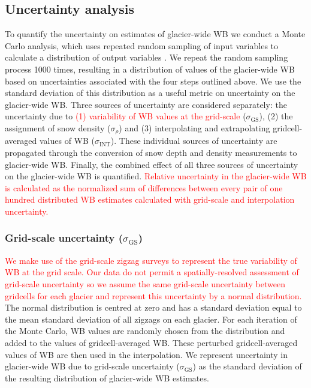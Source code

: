 \documentclass[twocolumn, letterpaper]{igs}
\begin{document}
\subsection{Uncertainty analysis}

To quantify the uncertainty on estimates of glacier-wide WB we conduct a Monte Carlo analysis, which uses repeated random sampling of input variables to calculate a distribution of output variables \citep{Metropolis1949}. We repeat the random sampling process 1000 times, resulting in a distribution of values of the glacier-wide WB based on uncertainties associated with the four steps outlined above. We use the standard deviation of this distribution as a useful metric on uncertainty on the glacier-wide WB. Three sources of uncertainty are considered separately: the uncertainty due to \textcolor{red}{(1) variability of WB values at the grid-scale} ($\sigma_{\mathrm{GS}}$), (2) the assignment of snow density ($\sigma_{\rho}$) and (3) interpolating and extrapolating gridcell-averaged values of WB ($\sigma_{\mathrm{INT}}$). These individual sources of uncertainty are propagated through the conversion of snow depth and density measurements to glacier-wide WB. Finally, the combined effect of all three sources of uncertainty on the glacier-wide WB is quantified. \textcolor{red}{Relative uncertainty in the glacier-wide WB is calculated as the normalized sum of differences between every pair of one hundred distributed WB estimates calculated with grid-scale and interpolation uncertainty.}

	\subsubsection{Grid-scale uncertainty ($\sigma_{\mathrm{GS}}$)}
\textcolor{red}{We make use of the grid-scale zigzag surveys to represent the true variability of WB at the grid scale. Our data do not permit a spatially-resolved assessment of grid-scale uncertainty so we assume the same grid-scale uncertainty between gridcells for each glacier and represent this uncertainty by a normal distribution.} The normal distribution is centred at zero and has a standard deviation equal to the mean standard deviation of all zigzags on each glacier. For each iteration of the Monte Carlo, WB values are randomly chosen from the distribution and added to the values of gridcell-averaged WB. These perturbed gridcell-averaged values of WB are then used in the interpolation. We represent uncertainty in glacier-wide WB due to grid-scale uncertainty ($\sigma_{\mathrm{GS}}$) as the standard deviation of the resulting distribution of glacier-wide WB estimates.  
\end{document}
